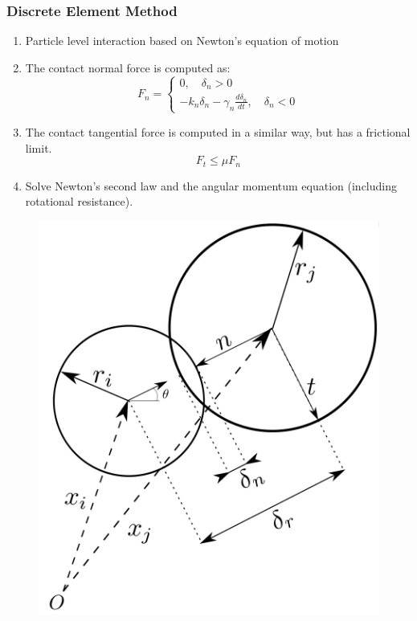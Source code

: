 \documentclass[notes]{beamer}
\begin{document}
\begin{frame}
	\frametitle{Discrete Element Method}
	\noindent
	\fboxsep=0pt
	\noindent
	\begin{minipage}[t]{0.65\linewidth}
		\begin{enumerate}
			\item Particle level interaction based on
			Newton's equation of motion
			\item The contact normal force is
			computed as:
			\begin{equation*}
			F_n = %
			\begin{cases}
			0, \quad \delta_n > 0\\
			-k_n \delta_n - \gamma_n \frac{d \delta_n}{dt}, \quad \delta_n < 0
			\end{cases}
			\end{equation*}
			\item The contact tangential force is
			computed in a similar way, but
			has a frictional limit.
			\begin{equation*}
			F_t \le \mu F_n
			\end{equation*}
			\item Solve Newton's second law and
			the angular momentum equation
			(including rotational resistance).
		\end{enumerate}
		
	\end{minipage}%
	\hfill
	\begin{minipage}[t]{0.35\linewidth}
		\begin{figure}
			\includegraphics[width=\textwidth]{figs/dem.png}
		\end{figure}
	\end{minipage}	
\end{frame}
\end{document}
